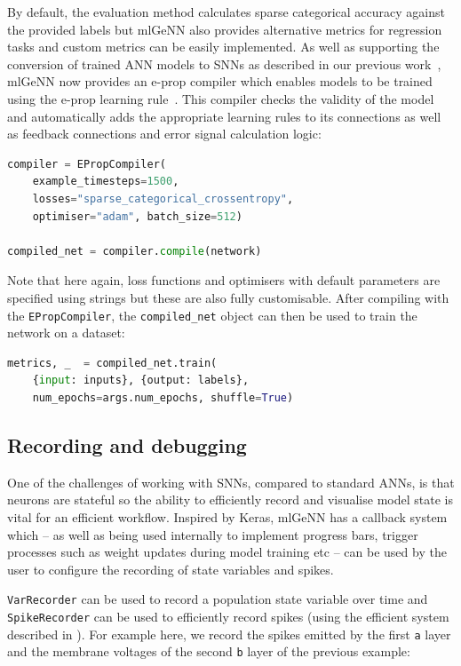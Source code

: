 \documentclass[sigconf]{acmart}
\begin{document}
By default, the evaluation method calculates sparse categorical accuracy against the provided labels but mlGeNN also provides alternative metrics for regression tasks and custom metrics can be easily implemented.
As well as supporting the conversion of trained ANN models to SNNs as described in our previous work~\citep{Turner2022}, mlGeNN now provides an e-prop compiler which enables models to be trained using the e-prop learning rule~\citep{Bellec2020}.
This compiler checks the validity of the model and automatically adds the appropriate learning rules to its connections as well as feedback connections and error signal calculation logic:

\begin{lstlisting}[language=Python]
compiler = EPropCompiler(
    example_timesteps=1500,
    losses="sparse_categorical_crossentropy",
    optimiser="adam", batch_size=512)

compiled_net = compiler.compile(network)
\end{lstlisting}
Note that here again, loss functions and optimisers with default parameters are specified using strings but these are also fully customisable.
After compiling with the \lstinline{EPropCompiler}, the \lstinline{compiled_net} object can then be used to train the network on a dataset:

\begin{lstlisting}[language=Python]
metrics, _  = compiled_net.train(
    {input: inputs}, {output: labels},
    num_epochs=args.num_epochs, shuffle=True)
\end{lstlisting}

\subsection{Recording and debugging}
One of the challenges of working with SNNs, compared to standard ANNs, is that neurons are stateful so the ability to efficiently record and visualise model state is vital for an efficient workflow.
Inspired by Keras, mlGeNN has a callback system which -- as well as being used internally to implement progress bars, trigger processes such as weight updates during model training etc -- can be used by the user to configure the recording of state variables and spikes.

\lstinline{VarRecorder} can be used to record a population state variable over time and \lstinline{SpikeRecorder} can be used to efficiently record spikes (using the efficient system described in \citet{Knight2021}).
For example here, we record the spikes emitted by the first \lstinline{a} layer and the membrane voltages of the second \lstinline{b} layer of the previous example:
\end{document}
